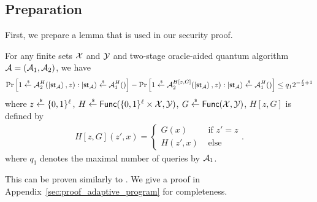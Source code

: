 \subsection{Preparation}
First, we prepare a lemma that is used in our security proof.
\begin{lemma}\label{lem:adaptive_program}
For any finite sets $\calX$ and $\calY$ and two-stage oracle-aided quantum algorithm $\A=(\A_1,\A_2)$, we have
\begin{align*}
\Pr\left[1 \sample \A_2^{H}(\ket{\st_\A},z):\ket{\st_\A}\sample\A_1^{H}()\right]-\Pr\left[1 \sample \A_2^{H[z,G]}(\ket{\st_\A},z):\ket{\st_\A}\sample\A_1^{H}()\right]\leq q_12^{-\frac{\ell}{2}+1}
\end{align*}
where 
$z\sample \bit^{\ell}$,
$H\sample \func(\bit^{\ell}\times \calX,\calY)$, $G\sample \func(\calX,\calY)$, $H[z,G]$ is defined by 
\begin{align*}
H[z,G](z',x)=
\begin{cases}
G(x) &\text{~if~}z'=z \\
H(z',x) &\text{~else}
\end{cases}.    
\end{align*}
where $q_1$ denotes the maximal number of queries by $\A_1$.
\end{lemma}
This can be proven similarly to \cite[Lemma 2.2]{EC:SaiXagYam18}. 
We give a proof in Appendix~\ref{sec:proof_adaptive_program} for completeness.

